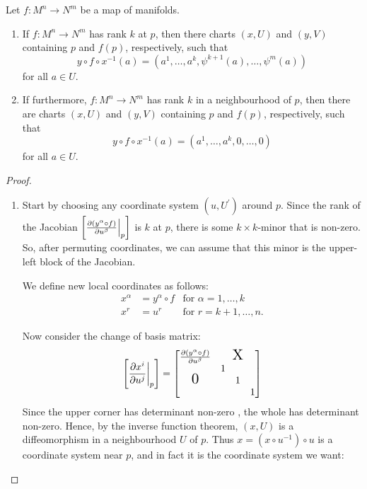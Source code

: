 \documentclass[11pt, english]{article}
\begin{document}
\begin{thm}
Let $f:M^n\to N^m$ be a map of manifolds.
\begin{enumerate}
\item If $f:M^n \to N^m$ has rank $k$ at $p$, then there charts $(x,U)$ and $(y,V)$ containing $p$ and $f(p)$, respectively, such that
\[
y \circ f \circ x^{-1}(a) = \left(a^1, \dotsc, a^k, \psi^{k+1}(a), \dotsc, \psi^m(a)\right)
\]
for all $a \in U$.
\item If furthermore, $f:M^n \to N^m$ has rank $k$ in a neighbourhood of $p$, then there are charts $(x,U)$ and $(y,V)$ containing $p$ and $f(p)$, respectively, such that
\[
y \circ f \circ x^{-1}(a) = \left( a^1, \dotsc, a^k, 0, \dotsc, 0 \right)
\]
for all $a \in U$.
\end{enumerate}
\end{thm}
\begin{proof}
  \begin{enumerate}
  \item Start by choosing any coordinate system $(u,U^\prime)$ around $p$. Since the rank of the Jacobian $\left[ \restr{\dd{(y^\alpha \circ f)}{u^\beta}}p \right ]$ is $k$ at $p$, there is some $k \times k$-minor that is non-zero. So, after permuting coordinates, we can assume that this minor is the upper-left block of the Jacobian.

We define new local coordinates as follows:
\begin{align*}
x^\alpha &= y^\alpha \circ f  &\text{for } \alpha={1,\dotsc, k} \\
x^r &= u^r &\text{for } r=k+1,\dotsc, n.
\end{align*}

Now consider the change of basis matrix:
\[
\left[ \restr{\dd{x^i}{u^j}}{p} \right] = \begin{bmatrix}
\dd{(y^\alpha \circ f)}{u^\beta}  & \scalebox{1.5}X \\
\scalebox {1.5}0 & \begin{matrix}1 & & \\  & 1 &  \\&  & 1\end{matrix}
\end{bmatrix}
\]
Since the upper corner has determinant non-zero , the whole has determinant non-zero. Hence, by the inverse function theorem, $(x,U)$ is a diffeomorphism in a neighbourhood $U$ of $p$. Thus $x = (x \circ u^{-1}) \circ u$ is a coordinate system near $p$, and in fact it is the coordinate system we want:


\end{enumerate}
\end{proof}
\end{document}
